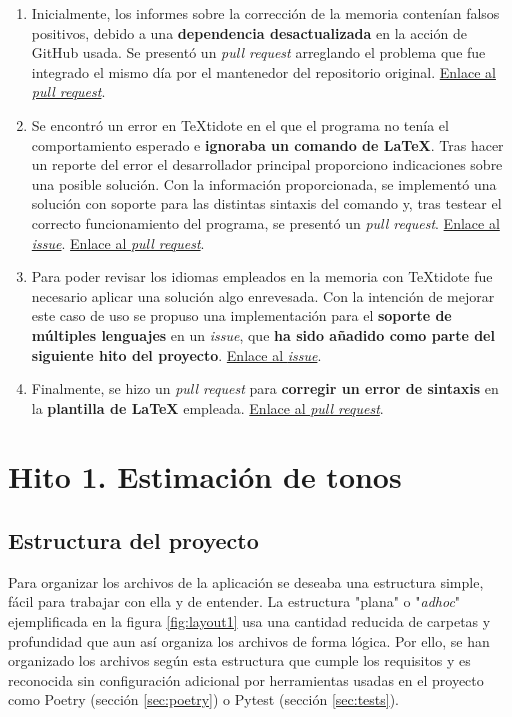\begin{enumerate}
	\item{Inicialmente, los informes sobre la corrección de la memoria contenían falsos positivos, debido a una \textbf{dependencia desactualizada} en la acción de GitHub usada. Se presentó un \textit{pull request} arreglando el problema que fue integrado el mismo día por el mantenedor del repositorio original. \href{https://github.com/ChiefGokhlayeh/textidote-action/pull/33}{Enlace al \textit{pull request}}.}
	
	\item{Se encontró un error en TeXtidote en el que el programa no tenía el comportamiento esperado e \textbf{ignoraba un comando de LaTeX}. Tras hacer un reporte del error el desarrollador principal proporciono indicaciones sobre una posible solución. Con la información proporcionada, se implementó una solución con soporte para las distintas sintaxis del comando y, tras testear el correcto funcionamiento del programa, se presentó un \textit{pull request}. \href{https://github.com/sylvainhalle/textidote/issues/208}{Enlace al \textit{issue}}. \href{https://github.com/sylvainhalle/textidote/pull/209}{Enlace al \textit{pull request}}.}
	
	\item{Para poder revisar los idiomas empleados en la memoria con TeXtidote fue necesario aplicar una solución algo enrevesada. Con la intención de mejorar este caso de uso se propuso una implementación para el \textbf{soporte de múltiples lenguajes} en un \textit{issue}, que \textbf{ha sido añadido como parte del siguiente hito del proyecto}. \href{https://github.com/sylvainhalle/textidote/issues/203}{Enlace al \textit{issue}}.}
	
	\item{Finalmente, se hizo un \textit{pull request} para \textbf{corregir un error de sintaxis} en la \textbf{plantilla de LaTeX} empleada. \href{https://github.com/JJ/plantilla-TFG-ETSIIT/pull/7}{Enlace al \textit{pull request}}.}
\end{enumerate}

\section{Hito 1. Estimación de tonos}

\subsection{Estructura del proyecto}
Para organizar los archivos de la aplicación se deseaba una estructura simple, fácil para trabajar con ella y de entender.  La estructura "plana" o "\textit{adhoc}"  ejemplificada en la figura \ref{fig:layout1} usa una cantidad reducida de carpetas y profundidad que aun así organiza los archivos de forma lógica.  Por ello, se han organizado los archivos según esta estructura  que cumple los requisitos y es reconocida sin configuración adicional por herramientas usadas en el proyecto como Poetry (sección \ref{sec:poetry}) o Pytest (sección \ref{sec:tests}).

